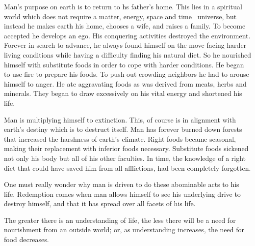 \documentclass[12pt,letterpaper]{article}
\newcommand{\mest}{matter, energy, space and time }
\begin{document}
Man's purpose on earth is to return to hs father's home. This lies in
a spiritual world which does not require a \mest\  universe, but instead
he makes earth his home, chooses a wife, and raises a family. To
become accepted he develops an ego. His conquering activities
destroyed the environment. Forever in search to advance, he always
found himself on the move facing harder living conditions while having
a difficulty finding his natural diet. So he nourished himself with
substitute foods in order to cope with harder conditions. He began to
use fire to prepare his foods. To push out crowding neighbors he had
to arouse himself to anger. He ate aggravating foods as was derived
from meats, herbs and minerals. They began to draw excessively on his
vital energy and shortened his life.

Man is multiplying himself to extinction. This, of course is in
alignment with earth's destiny which is to destruct itself. Man has
forever burned down forests that increased the harshness of earth's
climate. Right foods became seasonal, making their replacement with
inferior foods necessary. Substitute foods sickened not only his body
but all of his other faculties. In time, the knowledge of a right diet
that could have saved him from all afflictions, had been completely
forgotten.

One must really wonder why man is driven to do these abominable acts
to his life. Redemption comes when man allows himself to see his
underlying drive to destroy himself, and that it has spread over all
facets of his life.

The greater there is an understanding of life, the less there will be
a need for nourishment from an outside world; or, as understanding
increases, the need for food decreases.
\end{document}

